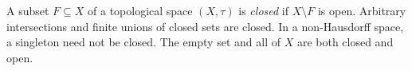 
A subset $F\subseteq X$ of a topological space $(X,\tau)$ is \emph{closed} if $X\setminus F$ is open. Arbitrary intersections and finite unions of closed sets are closed. In a non-Hausdorff space, a singleton need not be closed. The empty set and all of $X$ are both closed and open.
